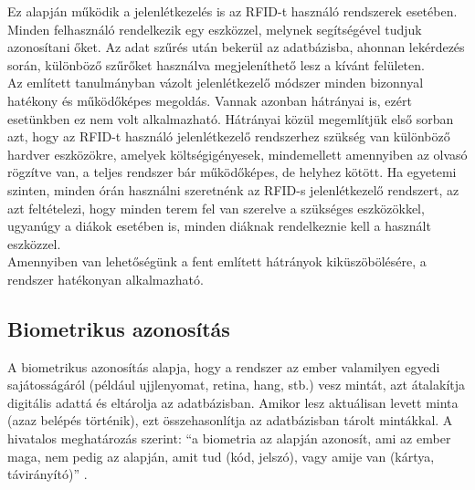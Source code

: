 \documentclass[12pt]{article}
\numberwithin{figure}{section}
\numberwithin{equation}{section}
\begin{document}
Ez alapján működik a jelenlétkezelés is az RFID-t használó rendszerek esetében. Minden felhasználó rendelkezik egy eszközzel, melynek segítségével tudjuk azonosítani őket. Az adat szűrés után bekerül az adatbázisba, ahonnan lekérdezés során, különböző szűrőket használva megjeleníthető lesz a kívánt felületen.\\
Az említett tanulmányban vázolt jelenlétkezelő módszer minden bizonnyal hatékony és működőképes megoldás. Vannak azonban hátrányai is, ezért esetünkben ez nem volt alkalmazható. Hátrányai közül megemlítjük első sorban azt, hogy az RFID-t használó jelenlétkezelő rendszerhez szükség van különböző hardver eszközökre, amelyek költségigényesek, mindemellett amennyiben az olvasó rögzítve van, a teljes rendszer bár működőképes, de helyhez kötött. Ha egyetemi szinten, minden órán használni szeretnénk az RFID-s jelenlétkezelő rendszert, az azt feltételezi, hogy minden terem fel van szerelve a szükséges eszközökkel, ugyanúgy a diákok esetében is, minden diáknak rendelkeznie kell a használt eszközzel.\\
Amennyiben van lehetőségünk a fent említett hátrányok kiküszöbölésére, a rendszer hatékonyan alkalmazható. \\

\subsection{Biometrikus azonosítás}
A biometrikus azonosítás alapja, hogy a rendszer az ember valamilyen egyedi sajátosságáról (például ujjlenyomat, retina, hang, stb.) vesz mintát, azt átalakítja digitális adattá és eltárolja az adatbázisban. Amikor lesz aktuálisan levett minta (azaz belépés történik), ezt összehasonlítja az adatbázisban tárolt mintákkal. A hivatalos meghatározás szerint: \enquote{a biometria az alapján azonosít, ami az ember maga, nem pedig az alapján, amit tud (kód, jelszó), vagy amije van (kártya, távirányító)} \cite{5}.  \\
\end{document}
